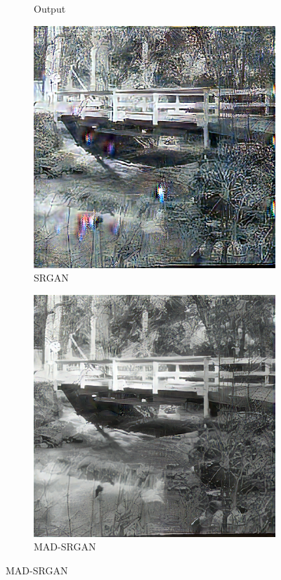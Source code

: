\documentclass[12pt,a4paper]{article}
\begin{document}
\begin{figure}[H]
\begin{subfigure}{0.2\textwidth}
                \caption*{Output}
            \end{subfigure}
            \enspace
            \begin{subfigure}{0.2\textwidth}
                \includegraphics[width=\textwidth]{images/samples/img-3-srgan.png}
                \caption*{SRGAN}
            \end{subfigure}
            \enspace
            \begin{subfigure}{0.2\textwidth}
                \includegraphics[width=\textwidth]{images/samples/img-3-mad-srgan.png}
                \caption*{MAD-SRGAN}
            \end{subfigure}
        \end{figure}
\end{document}

